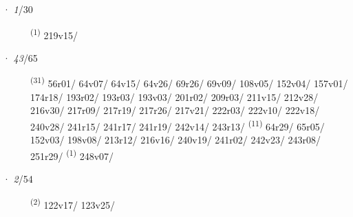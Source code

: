 \ENTRYEND
\noindent{} · \textit{1}/30 \LEMMALINE
\begin{description}
    \item[]  \textsuperscript{(1)} \mbox{219v15/}
\end{description}
\ENTRYEND
\noindent{} · \textit{43}/65 \LEMMALINE
\begin{description}
    \item[]  \textsuperscript{(31)} \mbox{56r01/} \mbox{64v07/} \mbox{64v15/} \mbox{64v26/} \mbox{69r26/} \mbox{69v09/} \mbox{108v05/} \mbox{152v04/} \mbox{157v01/} \mbox{174r18/} \mbox{193r02/} \mbox{193r03/} \mbox{193v03/} \mbox{201r02/} \mbox{209r03/} \mbox{211v15/} \mbox{212v28/} \mbox{216v30/} \mbox{217r09/} \mbox{217r19/} \mbox{217r26/} \mbox{217v21/} \mbox{222r03/} \mbox{222v10/} \mbox{222v18/} \mbox{240v28/} \mbox{241r15/} \mbox{241r17/} \mbox{241r19/} \mbox{242v14/} \mbox{243r13/} \CASEBREAK {} \textsuperscript{(11)} \mbox{64r29/} \mbox{65r05/} \mbox{152v03/} \mbox{198v08/} \mbox{213r12/} \mbox{216v16/} \mbox{240v19/} \mbox{241r02/} \mbox{242v23/} \mbox{243r08/} \mbox{251r29/} \CASEBREAK {} \textsuperscript{(1)} \mbox{248v07/}
\end{description}
\ENTRYEND
\noindent{} · \textit{2}/54 \LEMMALINE
\begin{description}
    \item[]  \textsuperscript{(2)} \mbox{122v17/} \mbox{123v25/}
\end{description}
